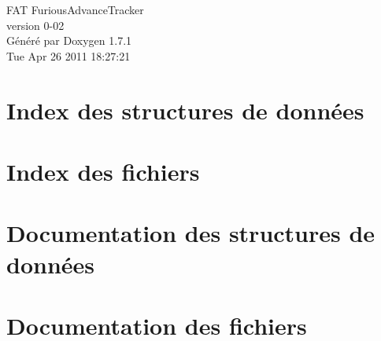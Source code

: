\documentclass[a4paper]{book}
\begin{document}
\hypersetup{pageanchor=false}
\begin{titlepage}
\vspace*{7cm}
\begin{center}
{\Large FAT FuriousAdvanceTracker \\[1ex]\large version 0-\/02 }\\
\vspace*{1cm}
{\large Généré par Doxygen 1.7.1}\\
\vspace*{0.5cm}
{\small Tue Apr 26 2011 18:27:21}\\
\end{center}
\end{titlepage}
\clearemptydoublepage
{}
\tableofcontents
\clearemptydoublepage
{}
\hypersetup{pageanchor=true}
\chapter{Index des structures de données}

\chapter{Index des fichiers}

\chapter{Documentation des structures de données}









\chapter{Documentation des fichiers}




\printindex
\end{document}
